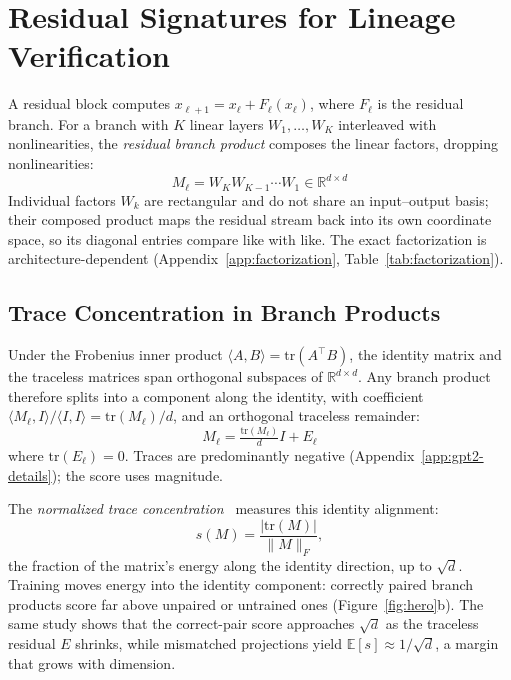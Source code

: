 \section{Residual Signatures for Lineage Verification}\label{sec:method}

A residual block computes $x_{\ell+1} = x_\ell + F_\ell(x_\ell)$, where $F_\ell$ is the residual branch. For a branch with $K$ linear layers $W_1, \ldots, W_K$ interleaved with nonlinearities, the \emph{residual branch product} composes the linear factors, dropping nonlinearities:
\begin{equation}\label{eq:branch-product}
M_\ell = W_K W_{K-1} \cdots W_1 \in \mathbb{R}^{d \times d}
\end{equation}
Individual factors $W_k$ are rectangular and do not share an input--output basis; their composed product maps the residual stream back into its own coordinate space, so its diagonal entries compare like with like. The exact factorization is architecture-dependent (Appendix~\ref{app:factorization}, Table~\ref{tab:factorization}).

\subsection{Trace Concentration in Branch Products}\label{sec:trace-concentration}

Under the Frobenius inner product $\langle A, B \rangle = \mathrm{tr}(A^\top B)$, the identity matrix and the traceless matrices span orthogonal subspaces of $\mathbb{R}^{d \times d}$. Any branch product therefore splits into a component along the identity, with coefficient $\langle M_\ell, I \rangle / \langle I, I \rangle = \mathrm{tr}(M_\ell)/d$, and an orthogonal traceless remainder:
\begin{equation}\label{eq:decomp}
M_\ell = \tfrac{\mathrm{tr}(M_\ell)}{d} I + E_\ell
\end{equation}
where $\mathrm{tr}(E_\ell) = 0$. Traces are predominantly negative (Appendix~\ref{app:gpt2-details}); the score uses magnitude.

The \emph{normalized trace concentration}~\citep{park2026idroppedneuralnet} measures this identity alignment:
\begin{equation}\label{eq:dd-score}
s(M) = \frac{|\mathrm{tr}(M)|}{\|M\|_F},
\end{equation}
the fraction of the matrix's energy along the identity direction, up to $\sqrt{d}$. Training moves energy into the identity component: correctly paired branch products score far above unpaired or untrained ones (Figure~\ref{fig:hero}b). The same study shows that the correct-pair score approaches $\sqrt{d}$ as the traceless residual $E$ shrinks, while mismatched projections yield $\mathbb{E}[s] \approx 1/\sqrt{d}$, a margin that grows with dimension.

